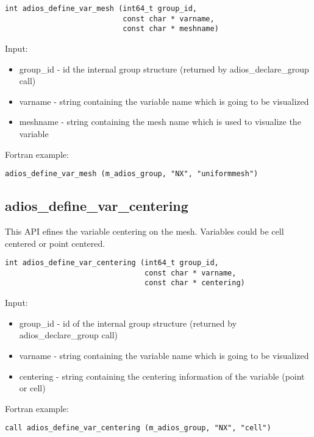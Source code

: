 \begin{lstlisting}[alsolanguage=C,caption={},label={}]
int adios_define_var_mesh (int64_t group_id, 
                           const char * varname, 
                           const char * meshname)
\end{lstlisting}

Input:
\begin{itemize}
\item group\_id - id the internal group structure (returned by adios\_declare\_group call)
\item varname - string containing the variable name which is going to be visualized
\item meshname - string containing the mesh name which is used to visualize the variable
\end{itemize}

Fortran example:
\begin{lstlisting}[alsolanguage=Fortran,caption={},label={}]
adios_define_var_mesh (m_adios_group, "NX", "uniformmesh")
\end{lstlisting}


\subsection{adios\_define\_var\_centering}
This API efines the variable centering on the mesh. Variables could be cell centered or point centered.

\begin{lstlisting}[alsolanguage=C,caption={},label={}]
int adios_define_var_centering (int64_t group_id, 
                                const char * varname, 
                                const char * centering)
\end{lstlisting}

Input:
\begin{itemize}
\item group\_id - id of the internal group structure (returned by adios\_declare\_group call)
\item varname - string containing the variable name which is going to be visualized
\item centering - string containing the centering information of the variable (point or cell)
\end{itemize}

Fortran example:
\begin{lstlisting}[alsolanguage=Fortran,caption={},label={}]
call adios_define_var_centering (m_adios_group, "NX", "cell")
\end{lstlisting}


